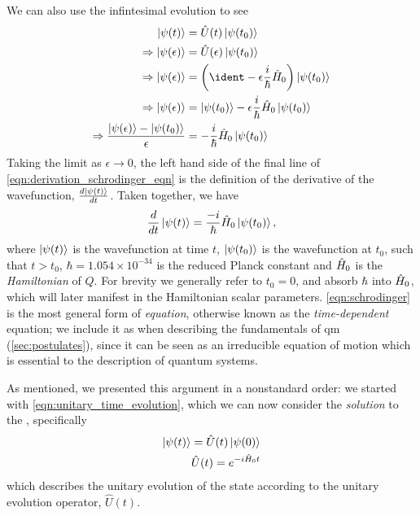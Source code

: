 \par 
We can also use the infintesimal evolution to see 
\begin{equation}
    \label{eqn:derivation_schrodinger_eqn}
    \begin{split}
        \ket{\psi(t)} &= \hat{U}(t) \ket{\psi(t_0)}
        \\ \Rightarrow \ket{\psi(\epsilon)} &= \hat{U}(\epsilon) \ket{\psi(t_0)}
        \\ \Rightarrow 
        \ket{\psi(\epsilon)} &= \left(\ident - \epsilon \frac{i}{\hbar} \ho \right) \ket{\psi(t_0)}
        \\ \Rightarrow \ket{\psi(\epsilon)} &= \ket{\psi(t_0)} - \epsilon \frac{i}{\hbar} \ho \ket{\psi(t_0)}
        \\ \Rightarrow \frac{\ket{\psi(\epsilon)} - \ket{\psi(t_0)} }{\epsilon}  &= - \frac{i}{\hbar} \ho \ket{\psi(t_0)}
    \end{split}
\end{equation}
Taking the limit as $\epsilon \rightarrow 0 $, the left hand side of the final line of \cref{eqn:derivation_schrodinger_eqn} is the definition
    of the derivative of the wavefunction, $\frac{d \ket{\psi(t)}}{dt}$. 
Taken together, we have 
\begin{equation}
    \label{eqn:schrodinger}
    \frac{d}{dt} \ket{\psi(t)} = \frac{-i}{\hbar} \hat{H}_0 \ket{\psi(t_0)},
\end{equation}
    where $\ket{\psi(t)}$ is the wavefunction at time $t$, 
    $\ket{\psi(t_0)}$ is the wavefunction at $t_0$, such that $t > t_0$, 
    $\hbar = 1.054 \times 10^{-34}$ is the reduced Planck constant and 
    $\hat{H}_0$ is the \emph{Hamiltonian} of $Q$. 
For brevity we generally refer to $t_0 = 0$, and absorb $\hbar$ into $\hat{H}_0$, which will later manifest in the Hamiltonian scalar parameters. 
\cref{eqn:schrodinger} is the most general form of \emph{\schrodinger equation}, 
    otherwise known as the \emph{time-dependent} \schrodinger equation; 
    we include it as  when describing the fundamentals of \gls{qm} (\cref{sec:postulates}), 
    since it can be seen as an irreducible equation of motion which is essential to the description of quantum systems. 
\par 

As mentioned, we presented this argument in a nonstandard order:
    we started with \cref{eqn:unitary_time_evolution}, which we can now consider the \emph{solution} to the \schrodinger, 
    specifically
\begin{equation}
    \label{eqn:unitary_evolution}
    \begin{split}
        \ket{\psi(t)} = \hat{U}(t) \ket{\psi(0)}
        \\
        \hat{U}(t) = e^{-i \hat{H}_0 t} 
    \end{split}
\end{equation}
    which describes the unitary evolution of the state according to the unitary evolution operator, $\hat{U}(t)$. 
\par 

